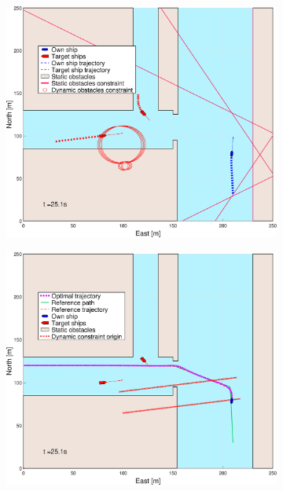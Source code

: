 \begin{figure}[!ht]
\begin{subfigure}[b]{0.494\textwidth}
        \subcaption{}
    \end{subfigure}
    \hfill
    \\
    \begin{subfigure}[b]{0.494\textwidth}
        \centering
        \includegraphics[width=\textwidth]{Images/Figures/Havn1/_Simple_1fig1_time=25}
        \subcaption{}
    \end{subfigure}
    \hfill
    \begin{subfigure}[b]{0.494\textwidth}
        \centering
        \includegraphics[width=\textwidth]{Images/Figures/Havn1/_Simple_1fig999_time=25}

\end{subfigure}
\end{figure}
